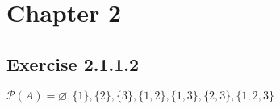 \documentclass[14pt]{article}
\begin{document}
\section*{Chapter 2}

\subsection*{Exercise 2.1.1.2}
$\mathcal{P}(A) = \varnothing, \{1\}, \{2\}, \{3\}, \{1,2\}, \{1,3\}, \{2,3\}, \{1,2,3\}$
\end{document}
